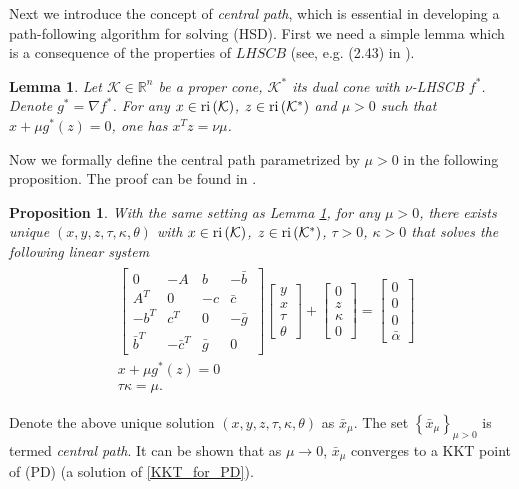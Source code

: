 \documentclass[10pt]{article}
\theoremstyle{definition}
\theoremstyle{plain}
\newtheorem{lemma}{Lemma}%
\newtheorem{prop}{Proposition}
\def\interior{\protect{\textnormal{ri}}}
\def\relint{\protect{\textnormal{ri}}}
\begin{document}
Next we introduce the concept of \textit{central path}, which is essential in developing a path-following algorithm for solving (HSD). First we need a simple lemma which is a consequence of the properties of $LHSCB$ (see, e.g. (2.43) in \cite{Robert_thesis}).
\begin{lemma}\label{x^plus_mu_g_dual_z_equals_0}
	Let $\mathcal{K}\in \mathbb{R}^n$ be a proper cone, $\mathcal{K}^*$ its dual cone with $\nu$-LHSCB $f^*$. Denote $g^* = \nabla f^*$. For any $x\in \interior\left(\mathcal{K}\right)$, $z\in \interior\left(\mathcal{K}^*\right)$ and $\mu > 0$ such that $x + \mu g^*(z) = 0$, one has $x^T z = \nu \mu$.
\end{lemma}
Now we formally define the central path parametrized by $\mu > 0$ in the following proposition. The proof can be found in \cite{Akle_thesis}.
	\begin{prop}
	With the same setting as Lemma \ref{x^plus_mu_g_dual_z_equals_0}, for any $\mu > 0$, there exists unique $\left(x, y, z, \tau, \kappa, \theta\right)$ with $x \in \interior\left(\mathcal{K}\right)$, $z \in \relint\left(\mathcal{K}^*\right)$, $\tau > 0$, $\kappa > 0$ that solves the following linear system
	\begin{align}\label{central^path_mu}
	\begin{split}
	&  \begin{bmatrix}
	0 & -A & b & -\bar b\ \\ 
	A^T & 0 & -c & \bar c \\
	-b^T & c^T& 0 & -\bar g \\
	\bar b^T & -\bar c^T & \bar g & 0
	\end{bmatrix}
	\begin{bmatrix}
	y \\ x \\ \tau \\ \theta
	\end{bmatrix} + 
	\begin{bmatrix}
	0 \\ z \\ \kappa \\ 0 
	\end{bmatrix} = 
	\begin{bmatrix}
	0 \\ 0 \\ 0 \\ \bar \alpha
	\end{bmatrix}\\
	& x + \mu g^*\left(z\right) = 0\\
	& \tau \kappa = \mu.
	\end{split}
	\end{align}
\end{prop}
Denote the above unique solution $(x,y,z,\tau,\kappa,\theta)$ as $\bar{x}_{\mu}$. The set $\left\{\bar{x}_{\mu} \right\}_{\mu > 0}$ is termed \textit{central path}. It can be shown that as $\mu \rightarrow 0$, $\bar{x}_{\mu}$ converges to a KKT point of (PD) (a solution of \eqref{KKT_for_PD}). \\ 
\end{document}
